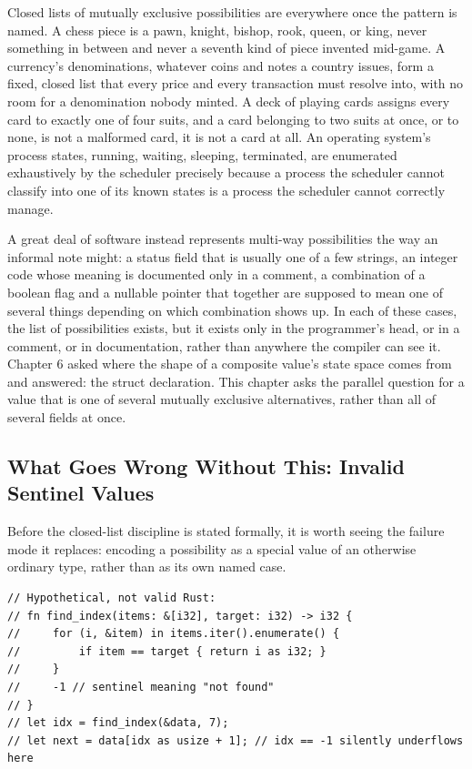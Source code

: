 \documentclass[11pt]{book}
\begin{document}
Closed lists of mutually exclusive possibilities are everywhere once the pattern is named. A chess piece is a pawn, knight, bishop, rook, queen, or king, never something in between and never a seventh kind of piece invented mid-game. A currency's denominations, whatever coins and notes a country issues, form a fixed, closed list that every price and every transaction must resolve into, with no room for a denomination nobody minted. A deck of playing cards assigns every card to exactly one of four suits, and a card belonging to two suits at once, or to none, is not a malformed card, it is not a card at all. An operating system's process states, running, waiting, sleeping, terminated, are enumerated exhaustively by the scheduler precisely because a process the scheduler cannot classify into one of its known states is a process the scheduler cannot correctly manage.

A great deal of software instead represents multi-way possibilities the way an informal note might: a status field that is usually one of a few strings, an integer code whose meaning is documented only in a comment, a combination of a boolean flag and a nullable pointer that together are supposed to mean one of several things depending on which combination shows up. In each of these cases, the list of possibilities exists, but it exists only in the programmer's head, or in a comment, or in documentation, rather than anywhere the compiler can see it. Chapter 6 asked where the shape of a composite value's state space comes from and answered: the struct declaration. This chapter asks the parallel question for a value that is one of several mutually exclusive alternatives, rather than all of several fields at once.

\subsection*{What Goes Wrong Without This: Invalid Sentinel Values}

Before the closed-list discipline is stated formally, it is worth seeing the failure mode it replaces: encoding a possibility as a special value of an otherwise ordinary type, rather than as its own named case.

\begin{lstlisting}
// Hypothetical, not valid Rust:
// fn find_index(items: &[i32], target: i32) -> i32 {
//     for (i, &item) in items.iter().enumerate() {
//         if item == target { return i as i32; }
//     }
//     -1 // sentinel meaning "not found"
// }
// let idx = find_index(&data, 7);
// let next = data[idx as usize + 1]; // idx == -1 silently underflows here
\end{lstlisting}
\end{document}
